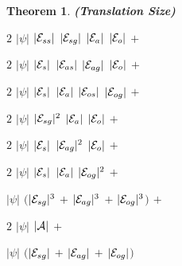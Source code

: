 \documentclass[11pt]{report}
\newtheorem{vvtheorem}{Theorem}[chapter]
\newenvironment{vtheorem}[1]
{
  \begin{vvtheorem}{{\bf (#1)}}
}
{
  \end{vvtheorem}
}
\newenvironment{vquote}
{
  \begin{list}{}{\leftmargin 1em}\item[]
}
{
  \end{list}
}
\begin{document}
\begin{vtheorem}{Translation Size}
\begin{vquote}
              \hspace{1em}
              $2$ $|\psi|$ $|{\cal E}_{ss}|$ $|{\cal E}_{sg}|$ $|{\cal E}_{a}|$ $|{\cal E}_{o}|$ $+$
 
              \hspace{1em}
              $2$ $|\psi|$ $|{\cal E}_{s}|$ $|{\cal E}_{as}|$ $|{\cal E}_{ag}|$ $|{\cal E}_{o}|$ $+$
 
              \hspace{1em}
              $2$ $|\psi|$ $|{\cal E}_{s}|$ $|{\cal E}_{a}|$ $|{\cal E}_{os}|$ $|{\cal E}_{og}|$ $+$
 
              \hspace{1em}
              $2$ $|\psi|$ $|{\cal E}_{sg}|^{2}$ $|{\cal E}_{a}|$ $|{\cal E}_{o}|$ $+$
 
              \hspace{1em}
              $2$ $|\psi|$ $|{\cal E}_{s}|$ $|{\cal E}_{ag}|^{2}$ $|{\cal E}_{o}|$ $+$
 
              \hspace{1em}
              $2$ $|\psi|$ $|{\cal E}_{s}|$ $|{\cal E}_{a}|$ $|{\cal E}_{og}|^{2}$ $+$
 
              \hspace{1em}
              $|\psi|$
              $($$|{\cal E}_{sg}|^{3}$ $+$
              $|{\cal E}_{ag}|^{3}$ $+$
              $|{\cal E}_{og}|^{3}$$)$ $+$
 
              \hspace{1em}
              $2$ $|\psi|$ $|{\cal A}|$ $+$
 
              \hspace{1em}
              $|\psi|$
              $($$|{\cal E}_{sg}|$ $+$ $|{\cal E}_{ag}|$ $+$ $|{\cal E}_{og}|$$)$
            \end{vquote}
          \end{vtheorem}
\end{document}
